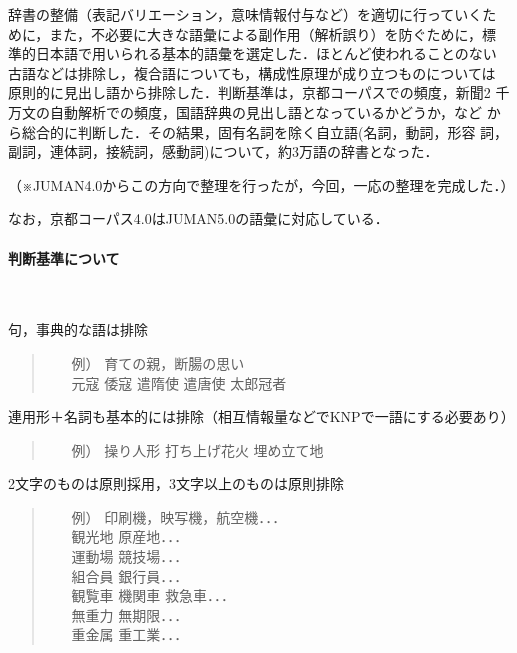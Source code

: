 \documentclass[a4j,titlepage]{jarticle}
\begin{document}
辞書の整備（表記バリエーション，意味情報付与など）を適切に行っていくた
めに，また，不必要に大きな語彙による副作用（解析誤り）を防ぐために，標
準的日本語で用いられる基本的語彙を選定した．ほとんど使われることのない
古語などは排除し，複合語についても，構成性原理が成り立つものについては
原則的に見出し語から排除した．判断基準は，京都コーパスでの頻度，新聞2
千万文の自動解析での頻度，国語辞典の見出し語となっているかどうか，など
から総合的に判断した．その結果，固有名詞を除く自立語(名詞，動詞，形容
詞，副詞，連体詞，接続詞，感動詞)について，約3万語の辞書となった．

（※JUMAN4.0からこの方向で整理を行ったが，今回，一応の整理を完成した．）

なお，京都コーパス4.0はJUMAN5.0の語彙に対応している．


\paragraph{判断基準について} \ 

句，事典的な語は排除
\begin{quote}
\begin{itemize}
 \item[例）] 育ての親，断腸の思い \\
	   元寇 倭寇 遣隋使 遣唐使 太郎冠者
\end{itemize}
\end{quote}

連用形＋名詞も基本的には排除（相互情報量などでKNPで一語にする必要あり）
\begin{quote}
\begin{itemize}
 \item[例）] 操り人形 打ち上げ花火 埋め立て地
\end{itemize}
\end{quote}

2文字のものは原則採用，3文字以上のものは原則排除
\begin{quote}
\begin{itemize}
 \item[例）] 印刷機，映写機，航空機．．． \\
	観光地 原産地．．． \\
	運動場 競技場．．． \\
	組合員 銀行員．．． \\
	観覧車 機関車 救急車．．． \\
	無重力 無期限．．． \\
	重金属 重工業．．．
\end{itemize}
\end{quote}
\end{document}
